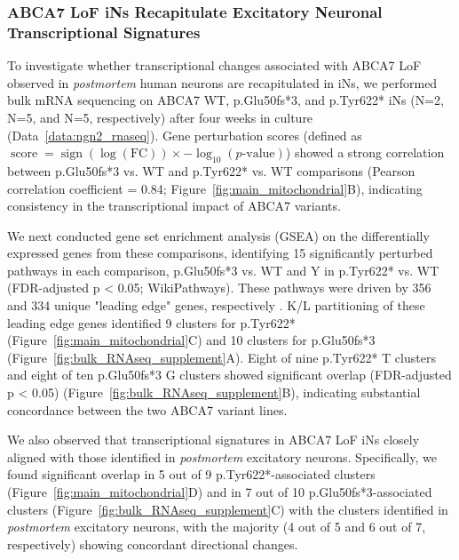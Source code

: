 \subsubsection{ABCA7 LoF iNs Recapitulate Excitatory Neuronal Transcriptional Signatures}
To investigate whether transcriptional changes associated with ABCA7 LoF observed in \emph{postmortem} human neurons are recapitulated in iNs, we performed bulk mRNA sequencing on ABCA7 WT, p.Glu50fs*3, and p.Tyr622* iNs (N=2, N=5, and N=5, respectively) after four weeks in culture (Data~\ref{data:ngn2_rnaseq}). Gene perturbation scores (defined as $\operatorname{score} = \operatorname{sign}(\log(\text{FC})) \times -\log_{10}(p\text{-value})$) showed a strong correlation between p.Glu50fs*3 vs. WT and p.Tyr622* vs. WT comparisons (Pearson correlation coefficient = 0.84; Figure~\ref{fig:main_mitochondrial}B), indicating consistency in the transcriptional impact of ABCA7 variants.

We next conducted gene set enrichment analysis (GSEA) on the differentially expressed genes from these comparisons, identifying 15 significantly perturbed pathways in each comparison, p.Glu50fs*3 vs. WT and Y in p.Tyr622* vs. WT (FDR-adjusted p < 0.05; WikiPathways). 
These pathways were driven by 356 and 334 unique "leading edge" genes, respectively \cite{Subramanian2005-pu}. K/L partitioning of these leading edge genes identified 9 clusters for p.Tyr622* (Figure~\ref{fig:main_mitochondrial}C) and 10 clusters for p.Glu50fs*3 (Figure~\ref{fig:bulk_RNAseq_supplement}A). Eight of nine p.Tyr622* T clusters and eight of ten p.Glu50fs*3 G clusters showed significant overlap (FDR-adjusted p < 0.05) (Figure~\ref{fig:bulk_RNAseq_supplement}B), indicating substantial concordance between the two ABCA7 variant lines.

We also observed that transcriptional signatures in ABCA7 LoF iNs closely aligned with those identified in \textit{postmortem} excitatory neurons. Specifically, we found significant overlap in 5 out of 9 p.Tyr622*-associated clusters (Figure~\ref{fig:main_mitochondrial}D) and in 7 out of 10 p.Glu50fs*3-associated clusters (Figure~\ref{fig:bulk_RNAseq_supplement}C) with the clusters identified in \textit{postmortem} excitatory neurons, with the majority (4 out of 5 and 6 out of 7, respectively) showing concordant directional changes.

